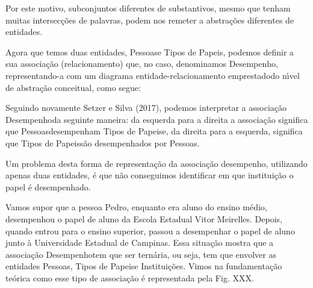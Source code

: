 \documentclass[
12pt,		%
openright,	%
twoside,  %
a4paper,			%
chapter=TITLE,		%
english,			%
french,				%
spanish,			%
brazil				%
]{USPSC-classe/USPSC}
\begin{document}
Por este motivo, subconjuntos diferentes de substantivos, mesmo que tenham muitas intersec\c{c}\~oes de palavras, podem nos remeter a abstra\c{c}\~oes diferentes de entidades.




Agora que temos duas entidades, \textquotedbl Pessoas\textquotedbl  e \textquotedbl Tipos de Papeis\textquotedbl , podemos definir a sua associa\c{c}\~ao (relacionamento) que, no caso, denominamos \textquotedbl Desempenho\textquotedbl , representando-a com um diagrama entidade-relacionamento \textquotedbl emprestado\textquotedbl  do n\'{\i}vel de abstra\c{c}\~ao conceitual, como segue:






Seguindo novamente  Setzer e Silva (2017), podemos interpretar a associa\c{c}\~ao \textquotedbl Desempenho\textquotedbl  da seguinte maneira: da esquerda para a direita a associa\c{c}\~ao significa que \textquotedbl Pessoas\textquotedbl  desempenham \textquotedbl Tipos de Papeis\textquotedbl  e, da direita para a esquerda, significa que \textquotedbl Tipos de Papeis\textquotedbl  s\~ao desempenhados por \textquotedbl Pessoas\textquotedbl .




Um problema desta forma de representa\c{c}\~ao da associa\c{c}\~ao desempenho, utilizando apenas duas entidades, \'e que n\~ao conseguimos identificar em que institui\c{c}\~ao o papel \'e desempenhado.




Vamos supor que a pessoa \textquotedbl Pedro\textquotedbl , enquanto era aluno do ensino m\'edio, desempenhou o papel de aluno da Escola Estadual Vitor Meirelles. Depois, quando entrou para o ensino superior, passou a desempenhar o papel de aluno junto \`a Universidade Estadual de Campinas. Essa situa\c{c}\~ao mostra que a associa\c{c}\~ao \textquotedbl Desempenho\textquotedbl  tem que ser tern\'aria, ou seja, tem que envolver as entidades \textquotedbl Pessoas\textquotedbl , \textquotedbl Tipos de Papeis\textquotedbl  e \textquotedbl Institui\c{c}\~oes\textquotedbl . Vimos na fundamenta\c{c}\~ao te\'orica como esse tipo de associa\c{c}\~ao \'e representada pela Fig. XXX.
\end{document}
